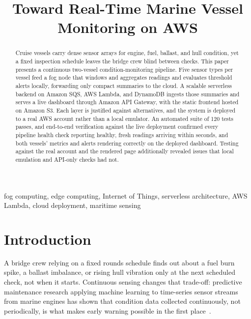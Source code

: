 \documentclass[conference]{IEEEtran}
\begin{document}
\title{Toward Real-Time Marine Vessel Monitoring on AWS}

\author{
}

\maketitle

\begin{abstract}
Cruise vessels carry dense sensor arrays for engine, fuel, ballast, and hull condition, yet a fixed inspection schedule leaves the bridge crew blind between checks. This paper presents a continuous two-vessel condition-monitoring pipeline. Five sensor types per vessel feed a fog node that windows and aggregates readings and evaluates threshold alerts locally, forwarding only compact summaries to the cloud. A scalable serverless backend on Amazon SQS, AWS Lambda, and DynamoDB ingests those summaries and serves a live dashboard through Amazon API Gateway, with the static frontend hosted on Amazon S3. Each layer is justified against alternatives, and the system is deployed to a real AWS account rather than a local emulator. An automated suite of 120 tests passes, and end-to-end verification against the live deployment confirmed every pipeline health check reporting healthy, fresh readings arriving within seconds, and both vessels' metrics and alerts rendering correctly on the deployed dashboard. Testing against the real account and the rendered page additionally revealed issues that local emulation and API-only checks had not.
\end{abstract}

\begin{IEEEkeywords}
fog computing, edge computing, Internet of Things, serverless architecture, AWS Lambda, cloud deployment, maritime sensing
\end{IEEEkeywords}

\section{Introduction}
A bridge crew relying on a fixed rounds schedule finds out about a fuel burn spike, a ballast imbalance, or rising hull vibration only at the next scheduled check, not when it starts. Continuous sensing changes that trade-off: predictive maintenance research applying machine learning to time-series sensor streams from marine engines has shown that condition data collected continuously, not periodically, is what makes early warning possible in the first place~\cite{ref1}.
\end{document}

